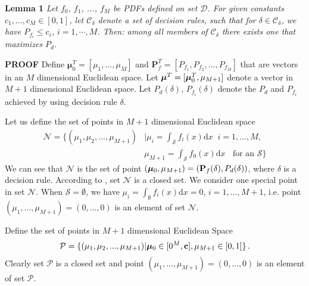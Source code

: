 \noindent \textbf{Lemma 1}
\noindent \textit{Let $f_0$, $f_1$, ..., $f_M$ be PDFs defined on set $\mathcal{D}$. For given constants $c_1, ..., c_M \in [0, 1]$, let $\mathcal{C}_\delta$ denote a set of decision rules,  such that for $\delta \in \mathcal{C}_\delta$, we have $P_{f_i} \leq c_i$, $i = 1, \cdots, M$. Then:
 among all members of $\mathcal{C}_\delta$ there exists one that maximizes $P_d$.}

\noindent \textbf{PROOF}
Define $\boldsymbol{\mu}_0^T = [\mu_1, ..., \mu_M]$  and  $\mathbf{P}_f^T = [P_{f_1}, P_{f_2}, ..., P_{f_M}]$ that are vectors in an $M$ dimensional Euclidean  space. Let $\boldsymbol{\mu}^T = [\boldsymbol{\mu}_0^T, \mu_{M+1}]$ denote a vector in $M+1$ dimensional Euclidean space. 
Let $P_d(\delta)$, $P_{f_i}(\delta)$ denote the $P_d$ and $P_{f_i}$ achieved by using decision rule $\delta$.

Let us define the set of points in $M+1$ dimensional Euclidean space
\begin{equation}
\begin{split}
\label{2015apr28a0}
  \mathcal{N} = \{(\mu_1, \mu_2, ..., \mu_{M+1}) &| \mu_i = \int_{\mathcal{S}}f_i(x)\mathrm{d}x \;\;i=1, ..., M,\\
                                            &  \mu_{M+1}=\int_{\mathcal{S}}f_{0}(x)\mathrm{d}x \;\;\text{ for an $\mathcal{S}$}\}
\end{split}
\end{equation}
We can see that $\mathcal{N}$ is the set of point $(\boldsymbol{\mu}_0, \mu_{M+1})=(\mathbf{P}_f(\delta), P_d(\delta))$, where $\delta$ is a decision rule. According to \cite{LehmannTest}, set $\mathcal{N}$ is a closed set. We consider one special point in set $\mathcal{N}$. When $\mathcal{S} = \emptyset$, we have $\mu_i = \int_{\emptyset}f_i(x)\mathrm{d}x = 0$, $i = 1, ..., M+1$, i.e. point $(\mu_1, ..., \mu_{M+1}) = (0, ..., 0)$ is an element of set $\mathcal{N}$.

Define the set of points in $M+1$ dimensional Euclidean Space 
\begin{equation}
\mathcal{P} = \{
(\mu_1, \mu_2, ..., \mu_{M+1}) | \boldsymbol{\mu}_0 \in [0^M, \mathbf{c}], \mu_{M+1} \in [0, 1]
\}\,.
\end{equation}
Clearly set $\mathcal{P}$ is a closed set and point $(\mu_1, ..., \mu_{M+1}) = (0, ..., 0)$ is an element  of set $\mathcal{P}$.


